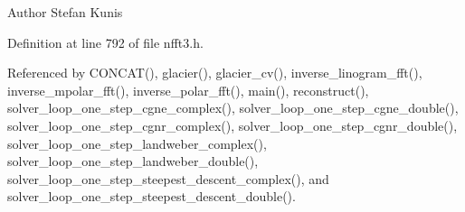 \begin{DoxyAuthor}{Author}
Stefan Kunis 
\end{DoxyAuthor}


Definition at line 792 of file nfft3.\-h.



Referenced by C\-O\-N\-C\-A\-T(), glacier(), glacier\-\_\-cv(), inverse\-\_\-linogram\-\_\-fft(), inverse\-\_\-mpolar\-\_\-fft(), inverse\-\_\-polar\-\_\-fft(), main(), reconstruct(), solver\-\_\-loop\-\_\-one\-\_\-step\-\_\-cgne\-\_\-complex(), solver\-\_\-loop\-\_\-one\-\_\-step\-\_\-cgne\-\_\-double(), solver\-\_\-loop\-\_\-one\-\_\-step\-\_\-cgnr\-\_\-complex(), solver\-\_\-loop\-\_\-one\-\_\-step\-\_\-cgnr\-\_\-double(), solver\-\_\-loop\-\_\-one\-\_\-step\-\_\-landweber\-\_\-complex(), solver\-\_\-loop\-\_\-one\-\_\-step\-\_\-landweber\-\_\-double(), solver\-\_\-loop\-\_\-one\-\_\-step\-\_\-steepest\-\_\-descent\-\_\-complex(), and solver\-\_\-loop\-\_\-one\-\_\-step\-\_\-steepest\-\_\-descent\-\_\-double().

